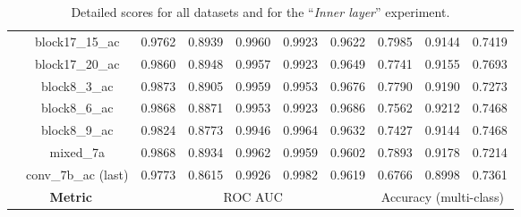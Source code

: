 \begin{table}
\begin{tabular}{|c|c|ccccc|ccc|}
    & block17\_15\_ac & 0.9762 & 0.8939 & 0.9960 & 0.9923 & 0.9622 & 0.7985 & 0.9144 & 0.7419 \\
    & block17\_20\_ac & 0.9860 & 0.8948 & 0.9957 & 0.9923 & 0.9649 & 0.7741 & 0.9155 & 0.7693 \\
    & block8\_3\_ac & 0.9873 & 0.8905 & 0.9959 & 0.9953 & 0.9676 & 0.7790 & 0.9190 & 0.7273 \\
    & block8\_6\_ac & 0.9868 & 0.8871 & 0.9953 & 0.9923 & 0.9686 & 0.7562 & 0.9212 & 0.7468 \\
    & block8\_9\_ac & 0.9824 & 0.8773 & 0.9946 & 0.9964 & 0.9632 & 0.7427 & 0.9144 & 0.7468 \\
    & mixed\_7a & 0.9868 & 0.8934 & 0.9962 & 0.9959 & 0.9602 & 0.7893 & 0.9178 & 0.7214 \\
    & conv\_7b\_ac (last) & 0.9773 & 0.8615 & 0.9926 & 0.9982 & 0.9619 & 0.6766 & 0.8998 & 0.7361 \\
    \hline
    \multicolumn{2}{|c|}{\textbf{Metric}} & \multicolumn{5}{c|}{ROC AUC} & \multicolumn{3}{c|}{Accuracy (multi-class)} \\
    \hline
  \end{tabular}
  \caption{Detailed scores for all datasets and for the ``\textit{Inner layer}'' experiment.}
  \label{app:comp:tab:detailed_second}
\end{table}
